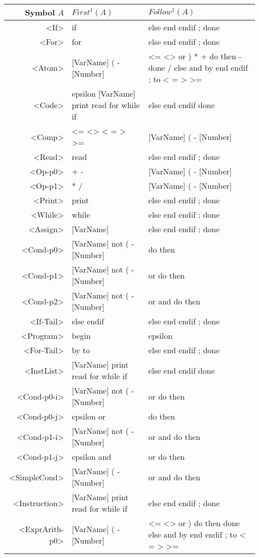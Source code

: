 \begin{longtable}{r p{7cm} p{7cm}}
\textnormal{Symbol} $A$ & $First^1(A)$ & $Follow^1(A)$\\ \hline
<If> & if  & else end endif ; done \\ \hline
<For> & for  & else end endif ; done \\ \hline
<Atom> & [VarName] ( - [Number]  & <= <> or ) * + do then - done / else and by end endif ; to < = > >= \\ \hline
<Code> & epsilon [VarName] print read for while if  & else end endif done \\ \hline
<Comp> & <= <> < = > >=  & [VarName] ( - [Number] \\ \hline
<Read> & read  & else end endif ; done \\ \hline
<Op-p0> & + -  & [VarName] ( - [Number] \\ \hline
<Op-p1> & * /  & [VarName] ( - [Number] \\ \hline
<Print> & print  & else end endif ; done \\ \hline
<While> & while  & else end endif ; done \\ \hline
<Assign> & [VarName]  & else end endif ; done \\ \hline
<Cond-p0> & [VarName] not ( - [Number]  & do then \\ \hline
<Cond-p1> & [VarName] not ( - [Number]  & or do then \\ \hline
<Cond-p2> & [VarName] not ( - [Number]  & or and do then \\ \hline
<If-Tail> & else endif  & else end endif ; done \\ \hline
<Program> & begin  & epsilon \\ \hline
<For-Tail> & by to  & else end endif ; done \\ \hline
<InstList> & [VarName] print read for while if  & else end endif done \\ \hline
<Cond-p0-i> & [VarName] not ( - [Number]  & or do then \\ \hline
<Cond-p0-j> & epsilon or  & do then \\ \hline
<Cond-p1-i> & [VarName] not ( - [Number]  & or and do then \\ \hline
<Cond-p1-j> & epsilon and  & or do then \\ \hline
<SimpleCond> & [VarName] ( - [Number]  & or and do then \\ \hline
<Instruction> & [VarName] print read for while if  & else end endif ; done \\ \hline
<ExprArith-p0> & [VarName] ( - [Number]  & <= <> or ) do then done else and by end endif ; to < = > >= \\ \hline

\end{longtable}
